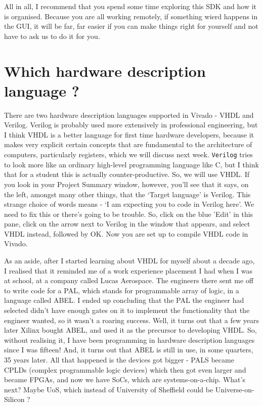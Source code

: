 \documentclass[../physical_computing.tex]{subfiles}
\begin{document}
All in all, I recommend that you spend some time exploring this SDK and how it is organised. Because you are all working remotely, if something wierd happens in the GUI, it will be far, far easier if you can make things right for yourself and not have to ask us to do it for you.

\section{Which hardware description language ?}
\label{sec:which_hdl}

There are two hardware description languages supported in Vivado - VHDL and Verilog. Verilog is probably used more extensively in professional engineering, but I think VHDL is a better language for first time hardware developers, because it makes very explicit certain concepts that are fundamental to the architecture of computers, particularly registers, which we will discuss next week. \texttt{Verilog} tries to look more like an ordinary high-level programming language like C, but I think that for a student this is actually counter-productive. So, we will use VHDL. If you look in your Project Summary window, however, you'll see that it says, on the left, amongst many other things, that the `Target language' is Verilog. This strange choice of words means - `I am expecting you to code in Verilog here'. We need to fix this or there's going to be trouble. So, click on the blue 'Edit' in this pane, click on the arrow next to Verilog in the window that appears, and select VHDL instead, followed by OK. Now you are set up to compile VHDL code in Vivado.

As an aside, after I started learning about VHDL for myself about a decade ago, I realised that it reminded me of a work experience placement I had when I was at school, at a company called Lucas Aerospace. The engineers there sent me off to write code for a PAL, which stands for programmable array of logic, in a language called ABEL. I ended up concluding that the PAL the engineer had selected didn't have enough gates on it to implement the functionality that the engineer wanted, so it wasn't a roaring success. Well, it turns out that a few years later Xilinx bought ABEL, and used it as the precursor to developing VHDL. So, without realising it, I have been programming in hardware description languages since I was fifteen! And, it turns out that ABEL is still in use, in some quarters, 35 years later. All that happened is the devices got bigger - PALS became CPLDs (complex programmable logic devices) which then got even larger and became FPGAs, and now we have SoCs, which are systems-on-a-chip. What's next? Maybe UoS, which instead of University of Sheffield could be Universe-on-Silicon ?
\end{document}
